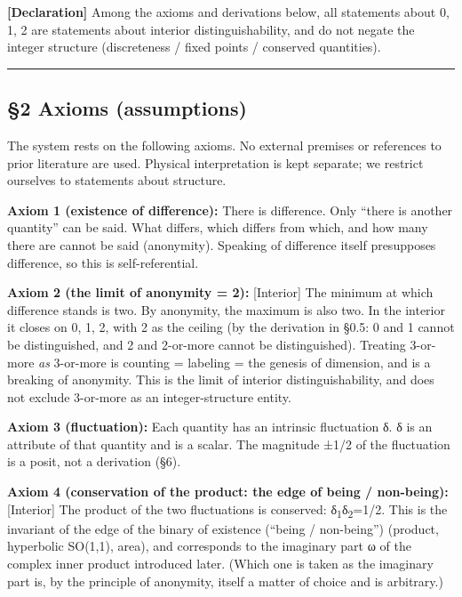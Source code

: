 \documentclass[11pt]{ltjsarticle}
\begin{document}
\textbf{{[}Declaration{]}} Among the axioms and derivations below, all
statements about 0, 1, 2 are statements about interior
distinguishability, and do not negate the integer structure
(discreteness / fixed points / conserved quantities).

\begin{center}\rule{0.5\linewidth}{0.5pt}\end{center}

\subsection{§2 Axioms (assumptions)}\label{axioms-assumptions}

The system rests on the following axioms. No external premises or
references to prior literature are used. Physical interpretation is kept
separate; we restrict ourselves to statements about structure.

\textbf{Axiom 1 (existence of difference):} There is difference. Only
``there is another quantity'' can be said. What differs, which differs
from which, and how many there are cannot be said (anonymity). Speaking
of difference itself presupposes difference, so this is
self-referential.

\textbf{Axiom 2 (the limit of anonymity = 2):} {[}Interior{]} The
minimum at which difference stands is two. By anonymity, the maximum is
also two. In the interior it closes on 0, 1, 2, with 2 as the ceiling
(by the derivation in §0.5: 0 and 1 cannot be distinguished, and 2 and
2-or-more cannot be distinguished). Treating 3-or-more \emph{as}
3-or-more is counting = labeling = the genesis of dimension, and is a
breaking of anonymity. This is the limit of interior distinguishability,
and does not exclude 3-or-more as an integer-structure entity.

\textbf{Axiom 3 (fluctuation):} Each quantity has an intrinsic
fluctuation δ. δ is an attribute of that quantity and is a scalar. The
magnitude ±1/2 of the fluctuation is a posit, not a derivation (§6).

\textbf{Axiom 4 (conservation of the product: the edge of being /
non-being):} {[}Interior{]} The product of the two fluctuations is
conserved: δ\textsubscript{1}δ\textsubscript{2}=1/2. This is the invariant of the edge of the binary of
existence (``being / non-being'') (product, hyperbolic SO(1,1), area),
and corresponds to the imaginary part ω of the complex inner product
introduced later. (Which one is taken as the imaginary part is, by the
principle of anonymity, itself a matter of choice and is arbitrary.)
\end{document}
